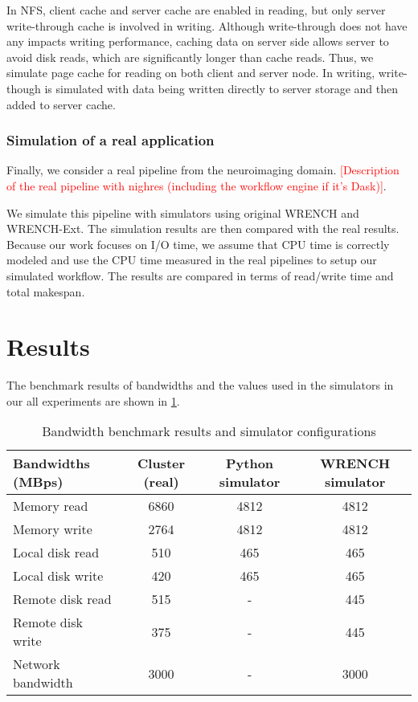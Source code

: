 \documentclass[conference]{IEEEtran}
\begin{document}
		    In NFS, client cache and server cache are enabled in reading, but only 
		    server write-through cache is involved in writing. 
		    Although write-through does not have any impacts writing performance, 
		    caching data on server side allows server to avoid disk reads, which are 
		    significantly longer than cache reads.
		    Thus, we simulate page cache for reading on both client and server node.
		    In writing, write-though is simulated with data being written directly to 
		    server storage and then added to server cache. 
		    
		    \subsubsection{Simulation of a real application}

		    Finally, we consider a real pipeline from the neuroimaging domain. 			
			\textcolor{red}{[Description of the real pipeline with nighres 
			(including the workflow engine if it's Dask)]}.  			
			
			We simulate this pipeline with simulators using original WRENCH and 
			WRENCH-Ext. 
			The simulation results are then compared with the real results. 
			Because our work focuses on I/O time, we assume that CPU time is 
			correctly modeled and use the CPU time measured in the real pipelines 
			to setup our simulated workflow. The results are compared in terms of 
			read/write time and total makespan.

	\section{Results}
	\label{results}			
		The benchmark results of bandwidths and the values used in the simulators 
		in our all experiments are shown in \ref{table:benchmark}. 
		
		\begin{table}
		\centering
		\begin{tabular}{|l|c|c|c|}
		\hline
			Bandwidths (MBps)  & Cluster (real) & Python simulator & WRENCH simulator\\
		\hline
			Memory read  & 6860	& 4812	 & 4812\\
			Memory write & 2764	& 4812 & 4812\\
			Local disk read & 510 & 465 & 465\\
			Local disk write & 420 & 465	 & 465\\
			Remote disk read & 515 & - & 445\\
			Remote disk write & 375 & - & 445\\
			Network bandwidth & 3000 & - & 3000\\
		\hline
		\end{tabular}
		\caption{Bandwidth benchmark results and simulator configurations}
		\label{table:benchmark}
		\end{table}		
		
\end{document}
